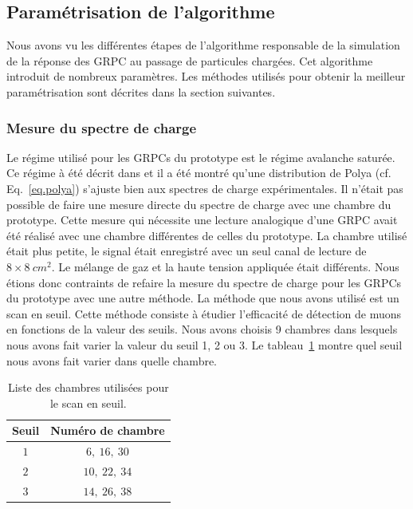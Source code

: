 
\subsection{Paramétrisation de l'algorithme}
\label{sec.param}
Nous avons vu les différentes étapes de l'algorithme responsable de la simulation de la réponse des GRPC au passage de particules chargées. Cet algorithme introduit de nombreux paramètres. Les méthodes utilisés pour obtenir la meilleur paramétrisation sont décrites dans la section suivantes. 

\subsubsection{Mesure du spectre de charge}
% 
\label{sec.polya}
Le régime utilisé pour les GRPCs du prototype est le régime avalanche saturée. Ce régime à été décrit dans \cite{abbresciaPolya} et il a été montré qu'une distribution de Polya (cf. Eq.~\ref{eq.polya}) s'ajuste bien aux spectres de charge expérimentales. Il n'était pas possible de faire une mesure directe du spectre de charge avec une chambre du prototype. Cette mesure qui nécessite une lecture analogique d'une GRPC avait été réalisé avec une chambre différentes de celles du prototype. La chambre utilisé était plus petite, le signal était enregistré avec un seul canal de lecture de $8 \times 8 ~cm^{2}$. Le mélange de gaz et la haute tension appliquée était différents. Nous étions donc contraints de refaire la mesure du spectre de charge pour les GRPCs du prototype avec une autre méthode. La méthode que nous avons utilisé est un scan en seuil. Cette méthode consiste à étudier l'efficacité de détection de muons en fonctions de la valeur des seuils. Nous avons choisis 9 chambres dans lesquels nous avons fait varier la valeur du seuil 1, 2 ou 3. Le tableau~\ref{tab.thrScan} montre quel seuil nous avons fait varier dans quelle chambre.
\begin{table}[!ht]
  \begin{center}
    \begin{tabular}{c|c}
      Seuil & Numéro de chambre\\
      \hline
      $1$ & $6,~16,~30$\\
      $2$ & $10,~22,~34$\\
      $3$ & $14,~26,~38$\\
    \end{tabular}
  \end{center}
  \caption{Liste des chambres utilisées pour le scan en seuil.}
  \label{tab.thrScan}
\end{table}
